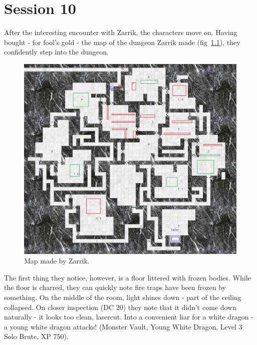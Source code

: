 \chapter{Session 10}
After the interesting encounter with Zarrik, the characters move on. Having bought - for fool's gold - the map of the dungeon Zarrik made (fig~\ref{fig:firsttemple}), they confidently step into the dungeon.
\begin{figure}[h]
    \centering
    \includegraphics[height=.5\textheight]{fig/firsttemple.jpg}
    \caption{\label{fig:firsttemple} Map made by Zarrik.}
\end{figure}

The first thing they notice, however, is a floor littered with frozen bodies. While the floor is charred, they can quickly note fire traps have been frozen by something. On the middle of the room, light shines down - part of the ceiling collapsed. On closer inspection (DC 20) they note that it didn't come down naturally - it looks too clean, lasercut. Into a convenient liar for a white dragon - a young white dragon attacks! (Monster Vault, Young White Dragon, Level 3 Solo Brute, XP 750).